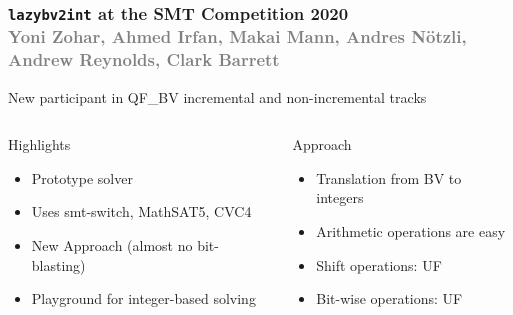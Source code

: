 \documentclass[t,aspectratio=43,9pt,bookmarks=false,dvipsnames,table]{beamer}
\newcommand{\lazybvtoint}{\texttt{lazybv2int}\xspace}
\newcommand{\qfbv}{QF\_BV\xspace}
\newcommand{\msat}{MathSAT5\xspace}
\newcommand{\cvcfour}{CVC4\xspace}
\newcommand{\smtswitch}{smt-switch\xspace}
\begin{document}
\newcommand{\gray}[1]{\textcolor{gray}{#1}}

\begin{frame}[t]
  \frametitle{\lazybvtoint at the SMT Competition 2020\\
    \footnotesize\gray{
      Yoni Zohar,
      Ahmed Irfan,
      Makai Mann,
      Andres N\"otzli,
      Andrew Reynolds,
      Clark Barrett
}}

  \small

 \begin{center}
New participant in \qfbv incremental and non-incremental tracks
\end{center}

  \begin{block}{}
  \begin{columns}
  \begin{alertblock}{Highlights}
  \begin{itemize}
  \item Prototype solver
    \item Uses \smtswitch, \msat, \cvcfour
    \item New Approach (almost no bit-blasting)
    \item Playground for integer-based solving
  \end{itemize}
  \end{alertblock}
  \begin{alertblock}{Approach}
      \begin{itemize}
  \item Translation from BV to integers
        \item Arithmetic operations are easy
        \item Shift operations: UF 
        \item Bit-wise operations: UF
      \end{itemize}
  \end{alertblock}
  \end{columns}
  \end{block}

\vspace{-1em}
  

\end{frame}
\end{document}

